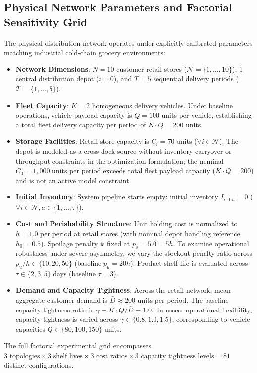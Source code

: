 \documentclass[11pt,a4paper]{article}
\theoremstyle{definition}
\theoremstyle{remark}
\begin{document}
\subsection{Physical Network Parameters and Factorial Sensitivity Grid}
\label{subsec:physical_params}
The physical distribution network operates under explicitly calibrated parameters matching industrial cold-chain grocery environments:
\begin{itemize}[leftmargin=*]
    \item \textbf{Network Dimensions}: $N = 10$ customer retail stores ($\mathcal{N} = \{1, \dots, 10\}$), 1 central distribution depot ($i = 0$), and $T = 5$ sequential delivery periods ($\mathcal{T} = \{1, \dots, 5\}$).
    \item \textbf{Fleet Capacity}: $K = 2$ homogeneous delivery vehicles. Under baseline operations, vehicle payload capacity is $Q = 100$ units per vehicle, establishing a total fleet delivery capacity per period of $K \cdot Q = 200$ units.
    \item \textbf{Storage Facilities}: Retail store capacity is $C_i = 70$ units ($\forall i \in \mathcal{N}$). The depot is modeled as a cross-dock source without inventory carryover or throughput constraints in the optimization formulation; the nominal $C_0 = 1{,}000$ units per period exceeds total fleet payload capacity ($K \cdot Q = 200$) and is not an active model constraint.
    \item \textbf{Initial Inventory}: System pipeline starts empty: initial inventory $I_{i,0,a} = 0$ ($\forall i \in \mathcal{N}, a \in \{1, \dots, \tau\}$).
    \item \textbf{Cost and Perishability Structure}: Unit holding cost is normalized to $h = 1.0$ per period at retail stores (with nominal depot handling reference $h_0 = 0.5$). Spoilage penalty is fixed at $p_s = 5.0 = 5h$. To examine operational robustness under severe asymmetry, we vary the stockout penalty ratio across $p_u / h \in \{10, 20, 50\}$ (baseline $p_u = 20h$). Product shelf-life is evaluated across $\tau \in \{2, 3, 5\}$ days (baseline $\tau = 3$).
    \item \textbf{Demand and Capacity Tightness}: Across the retail network, mean aggregate customer demand is $\bar{D} \approx 200$ units per period. The baseline capacity tightness ratio is $\gamma = K \cdot Q / \bar{D} = 1.0$. To assess operational flexibility, capacity tightness is varied across $\gamma \in \{0.8, 1.0, 1.5\}$, corresponding to vehicle capacities $Q \in \{80, 100, 150\}$ units.
\end{itemize}
The full factorial experimental grid encompasses $3 \text{ topologies} \times 3 \text{ shelf lives} \times 3 \text{ cost ratios} \times 3 \text{ capacity tightness levels} = 81$ distinct configurations.
\end{document}
